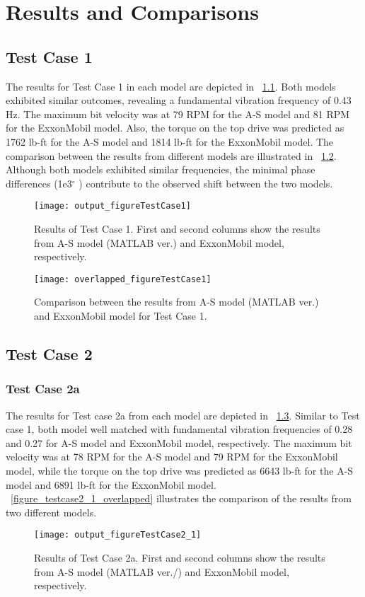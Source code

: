 \chapter{Results and Comparisons} 
\label{ch:results} 
\section{Test Case 1}
The results for Test Case 1 in each model are depicted in \figurename~\ref{figure_testcase1}. Both models exhibited similar outcomes, revealing a fundamental vibration frequency of 0.43 Hz. The maximum bit velocity was at 79 RPM for the A-S model and 81 RPM for the ExxonMobil model. Also, the torque on the top drive was predicted as 1762 lb-ft for the A-S model and 1814 lb-ft for the ExxonMobil model. The comparison between the results from different models are illustrated in \figurename~\ref{figure_testcase1_overlapped}. Although both models exhibited similar frequencies, the minimal phase differences (1e3$^{\circ}$ ) contribute to the observed shift between the two models.
\begin{figure}
  \centering
  \texttt{[image: output\_figureTestCase1]}
  \caption[Results of Test Case 1]{Results of Test Case 1. First and second columns show the results from A-S model (MATLAB ver.) and ExxonMobil model, respectively.}\label{figure_testcase1}
\end{figure}

\begin{figure}
  \centering
  \texttt{[image: overlapped\_figureTestCase1]}
  \caption[Comparison of the results for Test Case 1]{Comparison between the results from A-S model (MATLAB ver.) and ExxonMobil model for Test Case 1.}\label{figure_testcase1_overlapped}
\end{figure}

\section{Test Case 2}
\subsection{Test Case 2a}
The results for Test case 2a from each model are depicted in \figurename~\ref{figure_testcase2_1}. Similar to Test case 1, both model well matched with fundamental vibration frequencies of 0.28 and 0.27 for A-S model and ExxonMobil model, respectively. The maximum bit velocity was at 78 RPM for the A-S model and 79 RPM for the ExxonMobil model, while the torque on the top drive was predicted as 6643 lb-ft for the A-S model and 6891 lb-ft for the ExxonMobil model. \figurename~\ref{figure_testcase2_1_overlapped} illustrates the comparison of the results from two different models. 
\begin{figure}
  \centering
  \texttt{[image: output\_figureTestCase2\_1]}
  \caption[Results of Test Case 2a]{Results of Test Case 2a. First and second columns show the results from A-S model (MATLAB ver./) and ExxonMobil model, respectively.}\label{figure_testcase2_1}
\end{figure}

